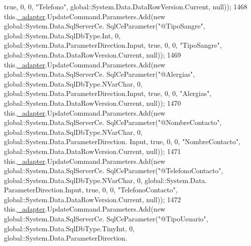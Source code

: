 \begin{DoxyCode}
       \textcolor{keyword}{true}, 0, 0, \textcolor{stringliteral}{"Telefono"}, global::System.Data.DataRowVersion.Current, null));
1468             this.\hyperlink{class_proyecto___integrador__3_1_1ds_usuarios_table_adapters_1_1_usuarios_table_adapter_ab48b9b83ce2db01dbbc83ad45b428a80}{\_adapter}.UpdateCommand.Parameters.Add(\textcolor{keyword}{new} global::System.Data.SqlServerCe.
      SqlCeParameter(\textcolor{stringliteral}{"@TipoSangre"}, global::System.Data.SqlDbType.Int, 0, global::System.Data.ParameterDirection.Input, \textcolor{keyword}{
      true}, 0, 0, \textcolor{stringliteral}{"TipoSangre"}, global::System.Data.DataRowVersion.Current, null));
1469             this.\hyperlink{class_proyecto___integrador__3_1_1ds_usuarios_table_adapters_1_1_usuarios_table_adapter_ab48b9b83ce2db01dbbc83ad45b428a80}{\_adapter}.UpdateCommand.Parameters.Add(\textcolor{keyword}{new} global::System.Data.SqlServerCe.
      SqlCeParameter(\textcolor{stringliteral}{"@Alergias"}, global::System.Data.SqlDbType.NVarChar, 0, global::System.Data.ParameterDirection.Input,
       \textcolor{keyword}{true}, 0, 0, \textcolor{stringliteral}{"Alergias"}, global::System.Data.DataRowVersion.Current, null));
1470             this.\hyperlink{class_proyecto___integrador__3_1_1ds_usuarios_table_adapters_1_1_usuarios_table_adapter_ab48b9b83ce2db01dbbc83ad45b428a80}{\_adapter}.UpdateCommand.Parameters.Add(\textcolor{keyword}{new} global::System.Data.SqlServerCe.
      SqlCeParameter(\textcolor{stringliteral}{"@NombreContacto"}, global::System.Data.SqlDbType.NVarChar, 0, global::System.Data.ParameterDirection.
      Input, \textcolor{keyword}{true}, 0, 0, \textcolor{stringliteral}{"NombreContacto"}, global::System.Data.DataRowVersion.Current, null));
1471             this.\hyperlink{class_proyecto___integrador__3_1_1ds_usuarios_table_adapters_1_1_usuarios_table_adapter_ab48b9b83ce2db01dbbc83ad45b428a80}{\_adapter}.UpdateCommand.Parameters.Add(\textcolor{keyword}{new} global::System.Data.SqlServerCe.
      SqlCeParameter(\textcolor{stringliteral}{"@TelefonoContacto"}, global::System.Data.SqlDbType.NVarChar, 0, global::System.Data.
      ParameterDirection.Input, \textcolor{keyword}{true}, 0, 0, \textcolor{stringliteral}{"TelefonoContacto"}, global::System.Data.DataRowVersion.Current, null));
1472             this.\hyperlink{class_proyecto___integrador__3_1_1ds_usuarios_table_adapters_1_1_usuarios_table_adapter_ab48b9b83ce2db01dbbc83ad45b428a80}{\_adapter}.UpdateCommand.Parameters.Add(\textcolor{keyword}{new} global::System.Data.SqlServerCe.
      SqlCeParameter(\textcolor{stringliteral}{"@TipoUsuario"}, global::System.Data.SqlDbType.TinyInt, 0, global::System.Data.ParameterDirection.

\end{DoxyCode}
